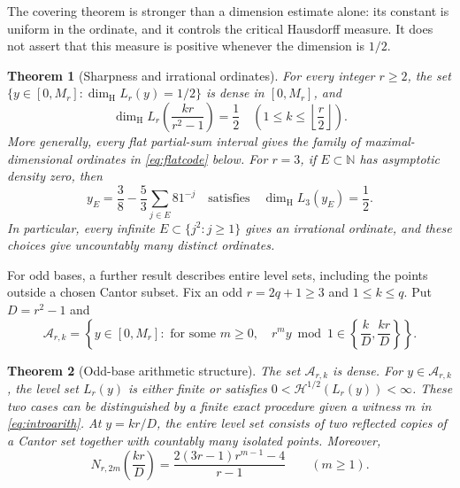 \documentclass[11pt]{article}
\newtheorem{theorem}{Theorem}[section]
\theoremstyle{definition}
\theoremstyle{remark}
\newcommand{\N}{\mathbb N}
\newcommand{\dimH}{\dim_{\mathrm H}}
\newcommand{\HH}{\mathcal H}
\begin{document}
The covering theorem is stronger than a dimension estimate alone: its
constant is uniform in the ordinate, and it controls the critical
Hausdorff measure. It does not assert that this measure is positive whenever
the dimension is $1/2$.

\begin{theorem}[Sharpness and irrational ordinates]\label{thm:sharpintro}
For every integer $r\ge2$, the set
$\{y\in[0,M_r]:\dimH L_r(y)=1/2\}$ is dense in $[0,M_r]$, and
\begin{equation}\label{eq:criticallevels}
 \dimH L_r\left(\frac{kr}{r^2-1}\right)=\frac12
 \quad\left(1\le k\le\left\lfloor\frac r2\right\rfloor\right).
\end{equation}
More generally, every flat partial-sum interval gives the family of
maximal-dimensional ordinates in \cref{eq:flatcode} below.
For $r=3$, if $E\subset\N$ has asymptotic density zero, then
\begin{equation}\label{eq:sparseintro}
 y_E=\frac38-\frac53\sum_{j\in E}81^{-j}
 \quad\text{satisfies}\quad \dimH L_3(y_E)=\frac12.
\end{equation}
In particular, every infinite $E\subset\{j^2:j\ge1\}$ gives an irrational
ordinate, and these choices give uncountably many distinct ordinates.
\end{theorem}

For odd bases, a further result describes entire level sets, including the
points outside a chosen Cantor subset. Fix an odd $r=2q+1\ge3$ and
$1\le k\le q$. Put $D=r^2-1$ and
\begin{equation}\label{eq:introarith}
 \mathcal A_{r,k}=
 \left\{y\in[0,M_r]:\text{ for some }m\ge0,\quad
 r^my\bmod1\in\left\{\frac{k}{D},\frac{kr}{D}\right\}\right\}.
\end{equation}

\begin{theorem}[Odd-base arithmetic structure]\label{thm:arithintro}
The set $\mathcal A_{r,k}$ is dense. For $y\in\mathcal A_{r,k}$, the level
set $L_r(y)$ is either finite or satisfies
$0<\HH^{1/2}(L_r(y))<\infty$. These two cases can be distinguished by a
finite exact procedure given a witness $m$ in \cref{eq:introarith}.
At $y=kr/D$, the entire level set consists of two reflected copies of a
Cantor set together with countably many isolated points. Moreover,
\begin{equation}\label{eq:criticalcountintro}
 N_{r,2m}\left(\frac{kr}{D}\right)
 =\frac{2(3r-1)r^{m-1}-4}{r-1}\qquad(m\ge1).
\end{equation}
\end{theorem}
\end{document}
